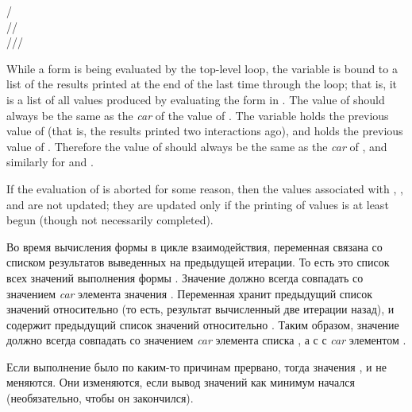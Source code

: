 \begin{defun}[Variable]
/ \\
// \\
///

While a form is being evaluated by the top-level loop,
the variable \cdf{/} is bound to a list of the results printed at the
end of the last time through the loop; that is, it is a list of all values
produced by evaluating the form in \cdf{+}.  The value of \cdf{*} should
always be the same as the \emph{car} of the value of \cdf{/}.
The variable \cdf{//} holds the previous value of \cdf{/} (that is, the results
printed two interactions ago), and \cdf{///} holds the previous value
of \cdf{//}.  Therefore the value of \cdf{**} should always be the same
as the \emph{car} of \cdf{//}, and similarly for \cdf{***} and \cdf{///}.

If the evaluation of \cdf{+} is aborted for some reason,
then the values associated with \cdf{/}, \cdf{//}, and \cdf{///} are not updated;
they are updated only if the printing of values is at least begun (though not
necessarily completed).

Во время вычисления формы в цикле взаимодействия,
переменная \cdf{/} связана со списком результатов выведенных на предыдущей
итерации. То есть это список всех значений выполнения формы \cdf{+}.
Значение \cdf{*} должно всегда совпадать со значением \emph{car} элемента
значения \cdf{/}.
Переменная \cdf{//} хранит предыдущий список значений относительно \cdf{/} (то
есть, результат вычисленный две итерации назад), и \cdf{///} содержит предыдущий
список значений относительно \cdf{///}. Таким образом, значение \cdf{**} должно
всегда совпадать со значением \emph{car} элемента списка \cdf{//}, а \cdf{***} с
с \emph{car} элементом \cdf{///}. 

Если выполнение \cdf{+} было по каким-то причинам прервано, тогда значения
\cdf{/}, \cdf{//} и \cdf{///} не меняются.
Они изменяются, если вывод значений как минимум начался (необязательно, чтобы он
закончился).
\end{defun}

